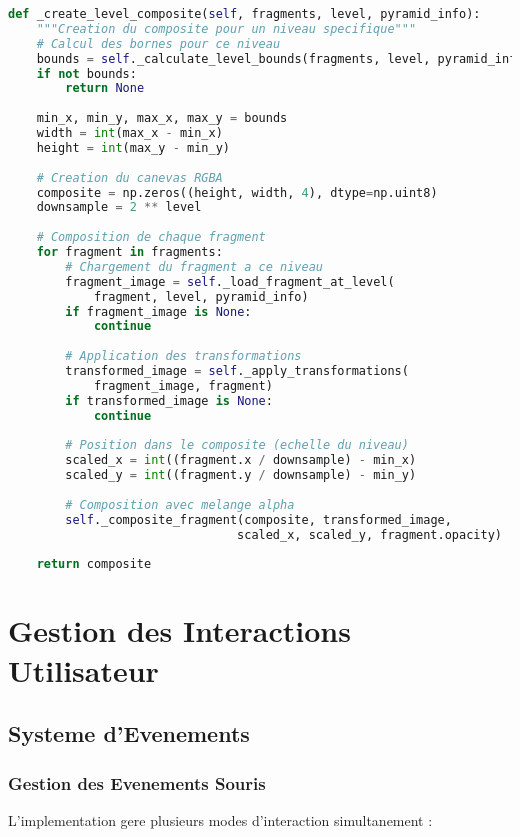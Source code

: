 \documentclass[12pt,a4paper]{article}
\begin{document}
\begin{lstlisting}[language=Python]
def _create_level_composite(self, fragments, level, pyramid_info):
    """Creation du composite pour un niveau specifique"""
    # Calcul des bornes pour ce niveau
    bounds = self._calculate_level_bounds(fragments, level, pyramid_info)
    if not bounds:
        return None
    
    min_x, min_y, max_x, max_y = bounds
    width = int(max_x - min_x)
    height = int(max_y - min_y)
    
    # Creation du canevas RGBA
    composite = np.zeros((height, width, 4), dtype=np.uint8)
    downsample = 2 ** level
    
    # Composition de chaque fragment
    for fragment in fragments:
        # Chargement du fragment a ce niveau
        fragment_image = self._load_fragment_at_level(
            fragment, level, pyramid_info)
        if fragment_image is None:
            continue
        
        # Application des transformations
        transformed_image = self._apply_transformations(
            fragment_image, fragment)
        if transformed_image is None:
            continue
        
        # Position dans le composite (echelle du niveau)
        scaled_x = int((fragment.x / downsample) - min_x)
        scaled_y = int((fragment.y / downsample) - min_y)
        
        # Composition avec melange alpha
        self._composite_fragment(composite, transformed_image, 
                                scaled_x, scaled_y, fragment.opacity)
    
    return composite
\end{lstlisting}

\section{Gestion des Interactions Utilisateur}

\subsection{Systeme d'Evenements}

\subsubsection{Gestion des Evenements Souris}

L'implementation gere plusieurs modes d'interaction simultanement :
\end{document}
